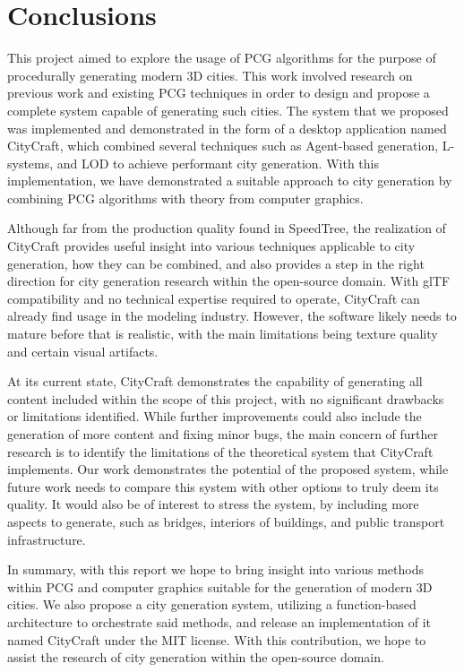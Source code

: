 \chapter{Conclusions}


This project aimed to explore the usage of PCG algorithms for the purpose of procedurally generating modern 3D cities.
This work involved research on previous work and existing PCG techniques in order to design and propose a complete system capable of generating such cities.
The system that we proposed was implemented and demonstrated in the form of a desktop application named CityCraft, which combined several techniques such as Agent-based generation, L-systems, and LOD to achieve performant city generation.
With this implementation, we have demonstrated a suitable approach to city generation by combining PCG algorithms with theory from computer graphics.

Although far from the production quality found in SpeedTree, the realization of CityCraft provides useful insight into various techniques applicable to city generation, how they can be combined, and also provides a step in the right direction for city generation research within the open-source domain.
With glTF compatibility and no technical expertise required to operate, CityCraft can already find usage in the modeling industry.
However, the software likely needs to mature before that is realistic, with the main limitations being texture quality and certain visual artifacts.

At its current state, CityCraft demonstrates the capability of generating all content included within the scope of this project, with no significant drawbacks or limitations identified.
While further improvements could also include the generation of more content and fixing minor bugs, the main concern of further research is to identify the limitations of the theoretical system that CityCraft implements.
Our work demonstrates the potential of the proposed system, while future work needs to compare this system with other options to truly deem its quality.
It would also be of interest to stress the system, by including more aspects to generate, such as bridges, interiors of buildings, and public transport infrastructure.

In summary, with this report we hope to bring insight into various methods within PCG and computer graphics suitable for the generation of modern 3D cities.
We also propose a city generation system, utilizing a function-based architecture to orchestrate said methods, and release an implementation of it named CityCraft under the MIT license.
With this contribution, we hope to assist the research of city generation within the open-source domain.
